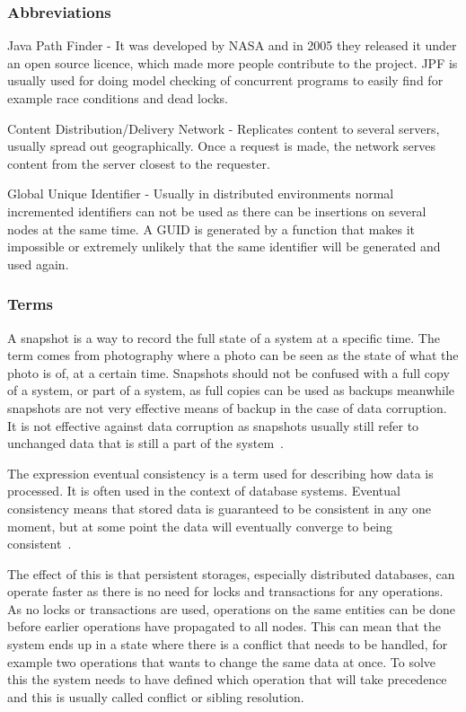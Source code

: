 \documentclass[a4paper,12pt]{article}
\newcounter{subsubsubsection}[subsubsection]
\begin{document}
\subsubsection{Abbreviations}
Java Path Finder - It was developed by NASA and in 2005 they released it under an open source
licence, which made more people contribute to the project. JPF is usually used for doing model
checking of concurrent programs to easily find for example race conditions and dead locks.

Content Distribution/Delivery Network - Replicates content to several servers, usually spread out
geographically. Once a request is made, the network serves content from the server closest to the
requester.

Global Unique Identifier - Usually in distributed environments normal incremented identifiers can
not be used as there can be insertions on several nodes at the same time. A GUID is generated by a
function that makes it impossible or extremely unlikely that the same identifier will be generated
and used again.

\subsubsection{Terms}
A snapshot is a way to record the full state of a system at a specific time. The term comes from
photography where a photo can be seen as the state of what the photo is of, at a certain time.
Snapshots should not be confused with a full copy of a system, or part of a system, as full copies 
can be used as backups meanwhile snapshots are not very effective means of backup in the case of 
data corruption. It is not effective against data corruption as snapshots usually still refer to 
unchanged data that is still a part of the system~\cite{SNAPSHOT}.

The expression eventual consistency is a term used for describing how data is processed. It is often
used in the context of database systems. Eventual consistency means that stored data is guaranteed 
to be consistent in any one moment, but at some point the data will eventually converge to being 
consistent~\cite{EVENTUAL}. 

The effect of this is that persistent storages, especially distributed databases, can
operate faster as there is no need for locks and transactions for any operations. As no locks or
transactions are used, operations on the same entities can be done before earlier operations have
propagated to all nodes. This can mean that the system ends up in a state where there is a conflict
that needs to be handled, for example two operations that wants to change the same data at once. To
solve this the system needs to have defined which operation that will take precedence and this is
usually called conflict or sibling resolution.
\end{document}
